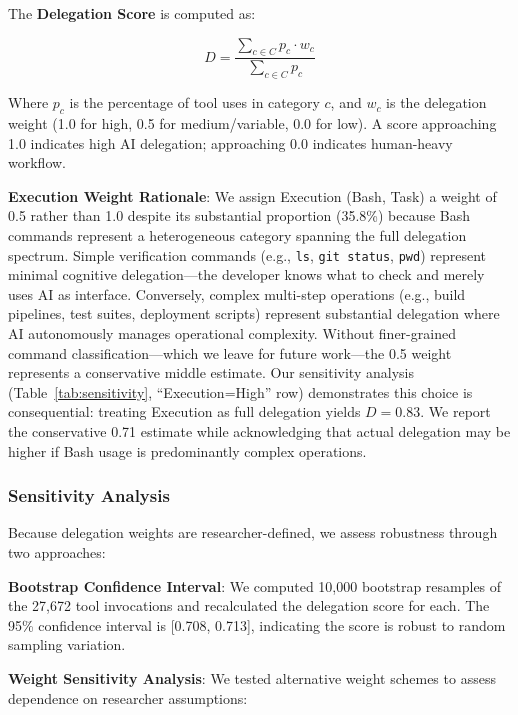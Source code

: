 \documentclass{ntlabs-preprint}
\begin{document}
The \textbf{Delegation Score} is computed as:

\begin{equation}
D = \frac{\sum_{c \in C} p_c \cdot w_c}{\sum_{c \in C} p_c}
\end{equation}

Where $p_c$ is the percentage of tool uses in category $c$, and $w_c$ is the delegation weight (1.0 for high, 0.5 for medium/variable, 0.0 for low). A score approaching 1.0 indicates high AI delegation; approaching 0.0 indicates human-heavy workflow.

\textbf{Execution Weight Rationale}: We assign Execution (Bash, Task) a weight of 0.5 rather than 1.0 despite its substantial proportion (35.8\%) because Bash commands represent a heterogeneous category spanning the full delegation spectrum. Simple verification commands (e.g., \texttt{ls}, \texttt{git status}, \texttt{pwd}) represent minimal cognitive delegation---the developer knows what to check and merely uses AI as interface. Conversely, complex multi-step operations (e.g., build pipelines, test suites, deployment scripts) represent substantial delegation where AI autonomously manages operational complexity. Without finer-grained command classification---which we leave for future work---the 0.5 weight represents a conservative middle estimate. Our sensitivity analysis (Table~\ref{tab:sensitivity}, ``Execution=High'' row) demonstrates this choice is consequential: treating Execution as full delegation yields $D = 0.83$. We report the conservative 0.71 estimate while acknowledging that actual delegation may be higher if Bash usage is predominantly complex operations.

\subsubsection{Sensitivity Analysis}
\label{sec:sensitivity}

Because delegation weights are researcher-defined, we assess robustness through two approaches:

\textbf{Bootstrap Confidence Interval}: We computed 10,000 bootstrap resamples of the 27,672 tool invocations and recalculated the delegation score for each. The 95\% confidence interval is [0.708, 0.713], indicating the score is robust to random sampling variation.

\textbf{Weight Sensitivity Analysis}: We tested alternative weight schemes to assess dependence on researcher assumptions:
\end{document}
